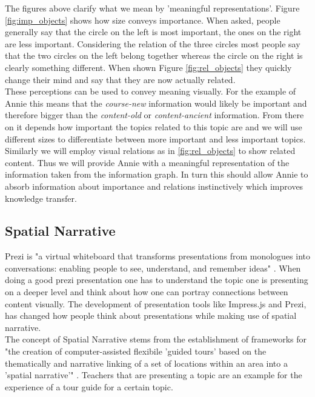 \documentclass[twoside]{article}
\begin{document}
The figures above clarify what we mean by 'meaningful representations'. Figure \ref{fig:imp_objects} shows how size conveys importance. When asked, people generally say that the circle on the left is most important, the ones on the right are less important. Considering the relation of the three circles most people say that the two circles on the left belong together whereas the circle on the right is clearly something different. When shown Figure \ref{fig:rel_objects} they quickly change their mind and say that they are now actually related.\\

These perceptions can be used to convey meaning visually. For the example of Annie this means that the \textit{course-new} information would likely be important and therefore bigger than the \textit{content-old} or \textit{content-ancient} information. From there on it depends how important the topics related to this topic are and we will use different sizes to differentiate between more important and less important topics. Similarly we will employ visual relations as in \ref{fig:rel_objects} to show related content. Thus we will provide Annie with a meaningful representation of the information taken from the information graph. In turn this should allow Annie to absorb information about importance and relations instinctively which improves knowledge transfer.\\


\subsection{Spatial Narrative}

Prezi is "a virtual whiteboard that transforms presentations from monologues into conversations: enabling people to see, understand, and remember ideas" \cite{Prezi:npentrel14}. When doing a good prezi presentation one has to understand the topic one is presenting on a deeper level and think about how one can portray connections between content visually. The development of presentation tools like Impress.js and Prezi, has changed how people think about presentations while making use of spatial narrative.\\

The concept of Spatial Narrative stems from the establishment of frameworks for "the creation of computer-assisted flexibile 'guided tours' based on the thematically and narrative linking of a set of locations within an area into a 'spatial narrative'" \cite{SpatialNarratives:npentrel14}. Teachers that are presenting a topic are an example for the experience of a tour guide for a certain topic.\\
\end{document}
